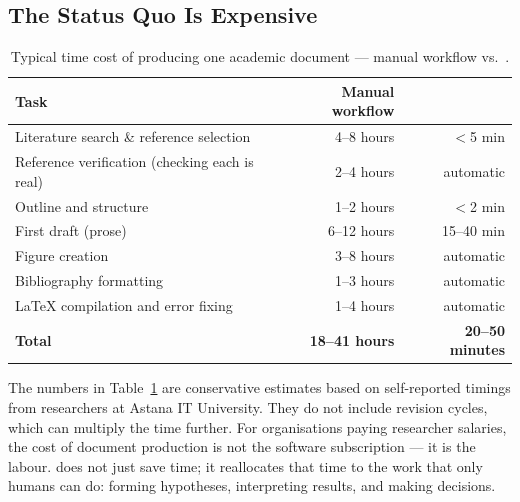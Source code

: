 \subsection{The Status Quo Is Expensive}

\begin{table}[h!]
\centering
\caption{Typical time cost of producing one academic document — manual workflow vs.\ \sys{}.}
\label{tab:time_comparison}
\begin{tabular}{lrr}
\toprule
Task & Manual workflow & \sys{} \\
\midrule
Literature search \& reference selection & 4--8 hours & $<$5 min \\
Reference verification (checking each is real) & 2--4 hours & automatic \\
Outline and structure & 1--2 hours & $<$2 min \\
First draft (prose) & 6--12 hours & 15--40 min \\
Figure creation & 3--8 hours & automatic \\
Bibliography formatting & 1--3 hours & automatic \\
\LaTeX{} compilation and error fixing & 1--4 hours & automatic \\
\midrule
\textbf{Total} & \textbf{18--41 hours} & \textbf{20--50 minutes} \\
\bottomrule
\end{tabular}
\end{table}

The numbers in Table~\ref{tab:time_comparison} are conservative estimates based on
self-reported timings from researchers at Astana IT University.
They do not include revision cycles, which can multiply the time further.
For organisations paying researcher salaries, the cost of document production is
not the software subscription — it is the labour.
\sys{} does not just save time; it reallocates that time to the work that only
humans can do: forming hypotheses, interpreting results, and making decisions.


